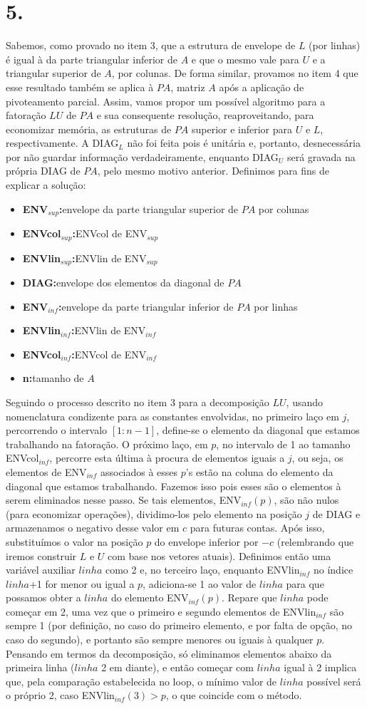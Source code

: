 \documentclass[a4paper, 12pt]{article}
\newcommand\litem[1]{\item{\bfseries #1}}
\begin{document}
\section{5.}
Sabemos, como provado no item 3, que a estrutura de envelope de $L$ (por linhas) é igual à da parte triangular inferior de $A$ e que o mesmo vale para $U$ e a triangular superior de $A$, por colunas. De forma similar, provamos no item 4 que esse resultado também se aplica à  $PA$, matriz $A$ após a aplicação de pivoteamento parcial. Assim, vamos propor um possível algoritmo para a fatoração $LU$ de $PA$ e sua consequente resolução, reaproveitando, para economizar memória, as estruturas de $PA$ superior e inferior para $U$ e $L$, respectivamente. A DIAG$_L$ não foi feita pois é unitária e, portanto, desnecessária por não guardar informação verdadeiramente, enquanto DIAG$_U$ será gravada na própria DIAG de $PA$, pelo mesmo motivo anterior. Definimos para fins de explicar a solução:
\begin{itemize}[label=\textbullet]
\litem{ENV$_{sup}$:}envelope da parte triangular superior de $PA$ por colunas
\litem{ENVcol$_{sup}$:}ENVcol de ENV$_{sup}$
\litem{ENVlin$_{sup}$:}ENVlin de ENV$_{sup}$
\litem{DIAG:}envelope dos elementos da diagonal de $PA$
\litem{ENV$_{inf}$:}envelope da parte triangular inferior de $PA$ por linhas
\litem{ENVlin$_{inf}$:}ENVlin de ENV$_{inf}$
\litem{ENVcol$_{inf}$:}ENVcol de ENV$_{inf}$
\litem{n:}tamanho de $A$
\end{itemize}

Seguindo o processo descrito no item 3 para a decomposição $LU$, usando nomenclatura condizente para as constantes envolvidas, no primeiro laço em $j$, percorrendo o intervalo $[1:n-1]$, define-se o elemento da diagonal que estamos trabalhando na fatoração. O próximo laço, em $p$, no intervalo de 1 ao tamanho ENVcol$_{inf}$, percorre esta última à procura de elementos iguais a $j$, ou seja, os elementos de ENV$_{inf}$ associados à esses $p$'s estão na coluna do elemento da diagonal que estamos trabalhando. Fazemos isso pois esses são o elementos à serem eliminados nesse passo. Se tais elementos, ENV$_{inf}(p)$, são não nulos (para economizar operações), dividimo-los pelo elemento na posição $j$ de DIAG e  armazenamos o negativo desse valor em $c$ para futuras contas. Após isso, substituímos o valor na posição $p$ do envelope inferior por $-c$ (relembrando que iremos construir $L$ e $U$ com base nos vetores atuais). Definimos então uma variável auxiliar $linha$ como 2 e, no terceiro laço, enquanto ENVlin$_{inf}$ no índice $linha$+1 for menor ou igual a $p$, adiciona-se 1 ao valor de $linha$ para que possamos obter a $linha$ do elemento ENV$_{inf}(p)$. Repare que $linha$ pode começar em 2, uma vez que o primeiro e segundo elementos de ENVlin$_{inf}$ são sempre 1 (por definição, no caso do primeiro elemento, e por falta de opção, no caso do segundo), e portanto são sempre menores ou iguais à qualquer $p$. Pensando em termos da decomposição, só eliminamos elementos abaixo da primeira linha ($linha$ 2 em diante), e então começar com $linha$ igual à 2 implica que, pela comparação estabelecida no loop, o mínimo valor de $linha$ possível será o próprio 2, caso ENVlin$_{inf}(3)>p$, o que coincide com o método.
\end{document}
